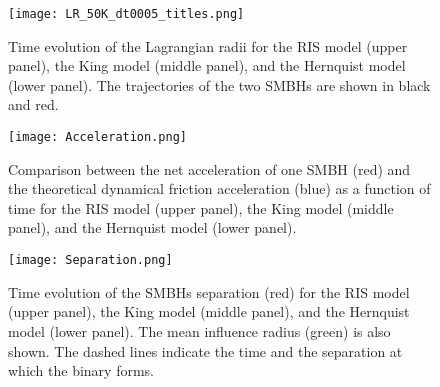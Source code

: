 \documentclass[fleqn,usenatbib]{mnras}
\begin{document}
\begin{figure}\centering
	\texttt{[image: LR\_50K\_dt0005\_titles.png]}
    \caption{Time evolution of the Lagrangian radii for the RIS model (upper panel), the King model (middle panel), and the Hernquist model (lower panel). The trajectories of the two SMBHs are shown in black and red.}
    \label{fig:Lagrangian_radii}
\end{figure}

\begin{figure}\centering
	\texttt{[image: Acceleration.png]}
    \caption{Comparison between the net acceleration of one SMBH (red) and the theoretical dynamical friction acceleration (blue) as a function of time for the RIS model (upper panel), the King model (middle panel), and the Hernquist model (lower panel).}
    \label{fig:Acceleration}
\end{figure}

\begin{figure}\centering
	\texttt{[image: Separation.png]}
    \caption{Time evolution of the SMBHs separation (red) for the RIS model (upper panel), the King model (middle panel), and the Hernquist model (lower panel). The mean influence radius (green) is also shown. The dashed lines indicate the time and the separation at which the binary forms.}
    \label{fig:Separation}
\end{figure}

\nocite{*}

 


\label{lastpage}
\end{document}
